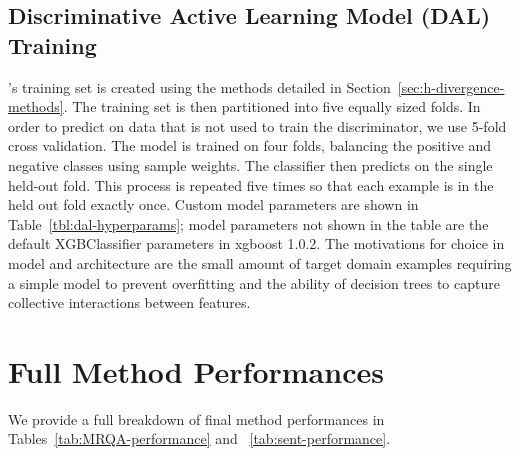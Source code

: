 \subsection{Discriminative Active Learning Model (DAL) Training}
\dal{}'s training set is created using the methods detailed in Section~\ref{sec:h-divergence-methods}. 
The training set is then partitioned into five equally sized folds. 
In order to predict on data that is not used to train the discriminator, we use 5-fold cross validation. 
The model is trained on four folds, balancing the positive and negative classes using sample weights. 
The classifier then predicts on the single held-out fold. 
This process is repeated five times so that each example is in the held out fold exactly once. 
Custom model parameters are shown in Table~\ref{tbl:dal-hyperparams}; model parameters not shown in the table are the default XGBClassifier parameters in xgboost 1.0.2.
The motivations for choice in model and architecture are the small amount of target domain examples requiring a simple model to prevent overfitting and the ability of decision trees to capture collective interactions between features. 

\section{Full Method Performances}
We provide a full breakdown of final method performances in Tables~\ref{tab:MRQA-performance} and ~\ref{tab:sent-performance}.








